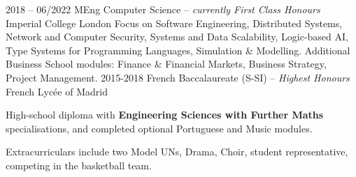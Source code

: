 \documentclass[9pt]{developercv}
\newcommand{\para}{\vspace{0.4em}}
\begin{document}
    \begin{entrylist}
        \entry
        {2018 -- 06/2022}
        {MEng Computer Science -- \emph{{\small currently} First Class Honours}}
        {Imperial College London}
        {
            Focus on Software Engineering,
            Distributed Systems,
            Network and Computer Security,
            Systems and Data Scalability,
            Logic-based AI,
            Type Systems for Programming Languages,
            Simulation \& Modelling.
%
            \para
            Additional Business School modules: Finance \& Financial Markets,
            Business Strategy, Project Management.
        }
        \entry
        {2015-2018}
        {French Baccalaureate (S-SI) --  \emph{Highest Honours}}
        {French Lycée of Madrid}
        {
            High-school diploma with \textbf{Engineering Sciences with Further Maths} specialisations,
            and completed optional Portuguese and Music modules.

            \para
            Extracurriculars include two Model UNs, Drama, Choir, student representative, competing in
            the basketball team.
        }
    \end{entrylist}
\end{document}
